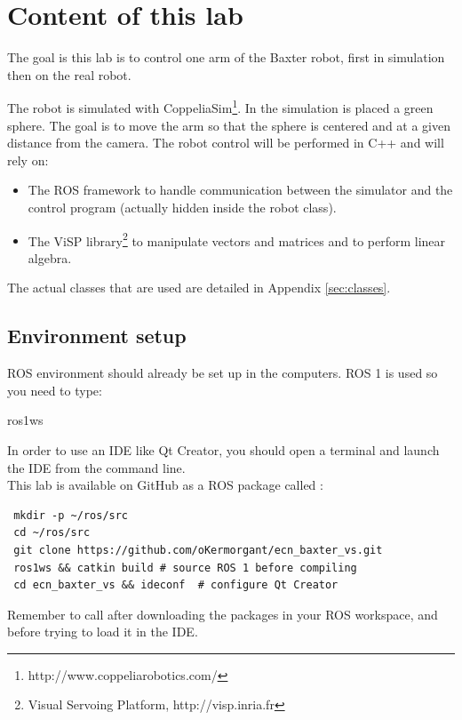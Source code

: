 \documentclass{ecnreport}
\begin{document}


\section{Content of this lab}

The goal is this lab is to control one arm of the Baxter robot, first in simulation then on the real robot. 

The robot is simulated with CoppeliaSim\footnote{http://www.coppeliarobotics.com/}.
In the simulation is placed a green sphere. The goal is to move the arm so that the sphere is centered and at a given distance from the camera.
The robot control will be performed in C++ and will rely on:

\begin{itemize}
 \item The ROS framework to handle communication between the simulator and the control program (actually hidden inside the robot class).
 \item The ViSP library\footnote{Visual Servoing Platform, http://visp.inria.fr} to manipulate vectors and matrices and to perform linear algebra.
\end{itemize}
The actual classes that are used are detailed in Appendix \ref{sec:classes}.\\

\subsection{Environment setup}

ROS environment should already be set up in the computers. ROS 1 is used so you need to type:
\begin{bashcodelarge}
 ros1ws
\end{bashcodelarge}

In order to use an IDE like Qt Creator, you should open a terminal and launch the IDE from the command line.\\
This lab is available on GitHub as a ROS package called :
\begin{center}\bashstyle
\begin{lstlisting}
 mkdir -p ~/ros/src
 cd ~/ros/src
 git clone https://github.com/oKermorgant/ecn_baxter_vs.git
 ros1ws && catkin build # source ROS 1 before compiling
 cd ecn_baxter_vs && ideconf  # configure Qt Creator
\end{lstlisting}
\end{center}
Remember to call {} after downloading the packages in your ROS workspace, and before trying to load it in the IDE.
\end{document}
